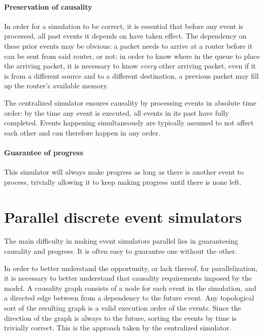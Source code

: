 \paragraph{Preservation of causality}

In order for a simulation to be correct, it is essential that before any event is processed, all past events it depends on have taken effect.
The dependency on these prior events may be obvious: a packet needs to arrive at a router before it can be sent from said router, or not: in order to know where in the queue to place the arriving packet, it is necessary to know \emph{every} other arriving packet, even if it is from a different source and to a different destination, a previous packet may fill up the router's available memory.

The centralized simulator ensures causality by processing events in absolute time order: by the time any event is executed, all events in its past have fully completed.
Events happening simultaneously are typically assumed to not affect each other and can therefore happen in any order.

\paragraph{Guarantee of progress}
This simulator will always make progress as long as there is another event to process, trivially allowing it to keep making progress until there is none left.



\section{Parallel discrete event simulators} \label{pdes}

The main difficulty in making event simulators parallel lies in guaranteeing causality and progress.
It is often easy to guarantee one without the other.

In order to better understand the opportunity, or lack thereof, for parallelization, it is necessary to better understand that causality requirements imposed by the model.
A causality graph consists of a node for each event in the simulation, and a directed edge between from a dependency to the future event.
Any topological sort of the resulting graph is a valid execution order of the events.
Since the direction of the graph is always to the future, sorting the events by time is trivially correct.
This is the approach taken by the centralized simulator.

